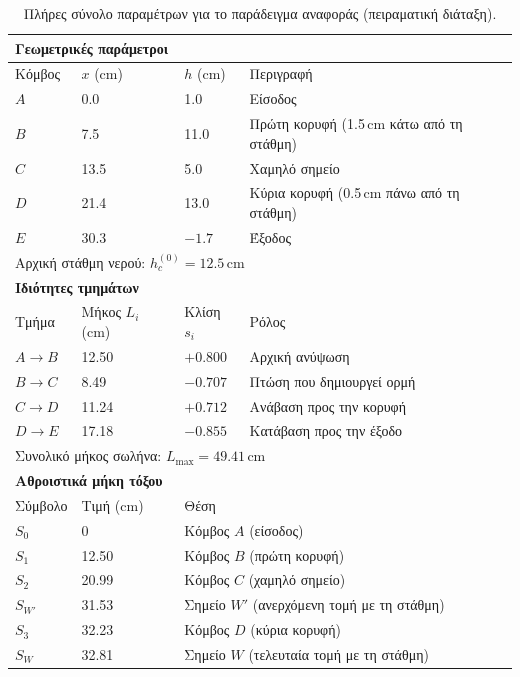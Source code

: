\documentclass[11pt]{article}
\begin{document}
\begin{table}[H]
\centering
\caption{Πλήρες σύνολο παραμέτρων για το παράδειγμα αναφοράς (πειραματική διάταξη).}
\label{tab:parameters}
\renewcommand{\arraystretch}{1.2}
\small
\begin{tabular}{llll}
\toprule
\multicolumn{4}{l}{\textbf{Γεωμετρικές παράμετροι}} \\
\midrule
Κόμβος & $x$ (cm) & $h$ (cm) & Περιγραφή \\
\midrule
$A$ & 0.0 & 1.0 & Είσοδος \\
$B$ & 7.5 & 11.0 & Πρώτη κορυφή (1.5\,cm κάτω από τη στάθμη) \\
$C$ & 13.5 & 5.0 & Χαμηλό σημείο \\
$D$ & 21.4 & 13.0 & Κύρια κορυφή (0.5\,cm πάνω από τη στάθμη) \\
$E$ & 30.3 & $-1.7$ & Έξοδος \\
\midrule
\multicolumn{4}{l}{Αρχική στάθμη νερού: $h_c^{(0)} = 12.5$\,cm} \\
\midrule
\multicolumn{4}{l}{\textbf{Ιδιότητες τμημάτων}} \\
\midrule
Τμήμα & Μήκος $L_i$ (cm) & Κλίση $s_i$ & Ρόλος \\
\midrule
$A \to B$ & 12.50 & $+0.800$ & Αρχική ανύψωση \\
$B \to C$ & 8.49 & $-0.707$ & Πτώση που δημιουργεί ορμή \\
$C \to D$ & 11.24 & $+0.712$ & Ανάβαση προς την κορυφή \\
$D \to E$ & 17.18 & $-0.855$ & Κατάβαση προς την έξοδο \\
\midrule
\multicolumn{4}{l}{Συνολικό μήκος σωλήνα: $L_{\max} = 49.41$\,cm} \\
\midrule
\multicolumn{4}{l}{\textbf{Αθροιστικά μήκη τόξου}} \\
\midrule
Σύμβολο & Τιμή (cm) & \multicolumn{2}{l}{Θέση} \\
\midrule
$S_0$ & 0 & \multicolumn{2}{l}{Κόμβος $A$ (είσοδος)} \\
$S_1$ & 12.50 & \multicolumn{2}{l}{Κόμβος $B$ (πρώτη κορυφή)} \\
$S_2$ & 20.99 & \multicolumn{2}{l}{Κόμβος $C$ (χαμηλό σημείο)} \\
$S_{W'}$ & 31.53 & \multicolumn{2}{l}{Σημείο $W'$ (ανερχόμενη τομή με τη στάθμη)} \\
$S_3$ & 32.23 & \multicolumn{2}{l}{Κόμβος $D$ (κύρια κορυφή)} \\
$S_W$ & 32.81 & \multicolumn{2}{l}{Σημείο $W$ (τελευταία τομή με τη στάθμη)} \\

\end{tabular}
\end{table}
\end{document}
